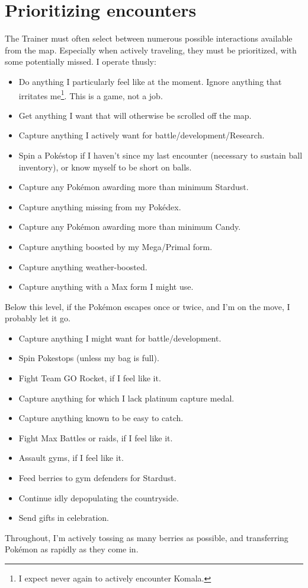\section{Prioritizing encounters}
\label{sec:prioritymap}
The Trainer must often select between numerous possible interactions available from the map.
Especially when actively traveling, they must be prioritized, with some potentially missed.
I operate thusly:
\begin{itemize}
\item Do anything I particularly feel like at the moment.
      Ignore anything that irritates me\footnote{I expect never again to actively encounter Komala.}.
      This is a game, not a job.
\item Get anything I want that will otherwise be scrolled off the map.
\item Capture anything I actively want for battle/development/Research.
\item Spin a Pokéstop if I haven't since my last encounter (necessary to sustain ball inventory),
       or know myself to be short on balls.
\item Capture any Pokémon awarding more than minimum Stardust.
\item Capture anything missing from my Pokédex.
\item Capture any Pokémon awarding more than minimum Candy.
\item Capture anything boosted by my Mega/Primal form.
\item Capture anything weather-boosted.
\item Capture anything with a Max form I might use.
\end{itemize}
Below this level, if the Pokémon escapes once or twice, and I'm on the move,
I probably let it go.
\begin{itemize}
\item Capture anything I might want for battle/development.
\item Spin Pokestops (unless my bag is full).
\item Fight Team GO Rocket, if I feel like it.
\item Capture anything for which I lack platinum capture medal.
\item Capture anything known to be easy to catch.
\item Fight Max Battles or raids, if I feel like it.
\item Assault gyms, if I feel like it.
\item Feed berries to gym defenders for Stardust.
\item Continue idly depopulating the countryside.
\item Send gifts in celebration.
\end{itemize}
Throughout, I'm actively tossing as many berries as possible, and
 transferring Pokémon as rapidly as they come in.


